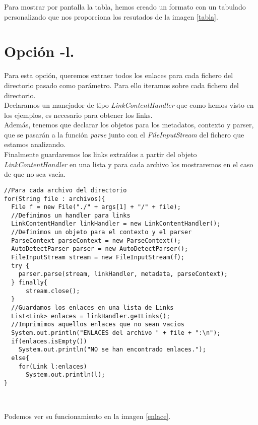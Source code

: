 \documentclass[12pt]{article}
\begin{document}
Para mostrar por pantalla la tabla, hemos creado un formato con un tabulado personalizado que nos proporciona los resutados de la imagen \ref{tabla}.

\section{Opción \textbf{-l}.}

Para esta opción, queremos extraer todos los enlaces para cada fichero del directorio pasado como parámetro. Para ello iteramos sobre cada fichero del directorio.\\

Declaramos un manejador de tipo \textit{LinkContentHandler} que como hemos visto en los ejemplos, es necesario para obtener los links.\cite{tika}\\

Además, tenemos que declarar los objetos para los metadatos, contexto y parser, que se pasarán a la función \textit{parse} junto con el \textit{FileInputStream} del fichero que estamos analizando.\\

Finalmente guardaremos los links extraídos a partir del objeto \textit{LinkContentHandler} en una lista y para cada archivo los mostraremos en el caso de que no sea vacía.\\

\begin{lstlisting}
//Para cada archivo del directorio
for(String file : archivos){
  File f = new File("./" + args[1] + "/" + file);
  //Definimos un handler para links
  LinkContentHandler linkHandler = new LinkContentHandler();
  //Definimos un objeto para el contexto y el parser
  ParseContext parseContext = new ParseContext();
  AutoDetectParser parser = new AutoDetectParser();
  FileInputStream stream = new FileInputStream(f);
  try {
    parser.parse(stream, linkHandler, metadata, parseContext);
  } finally{
      stream.close();
  }
  //Guardamos los enlaces en una lista de Links
  List<Link> enlaces = linkHandler.getLinks();
  //Imprimimos aquellos enlaces que no sean vacios
  System.out.println("ENLACES del archivo " + file + ":\n");
  if(enlaces.isEmpty())
    System.out.println("NO se han encontrado enlaces.");
  else{
    for(Link l:enlaces)
      System.out.println(l);
}
\end{lstlisting}\

Podemos ver su funcionamiento en la imagen \ref{enlace}.

\clearpage
\end{document}
